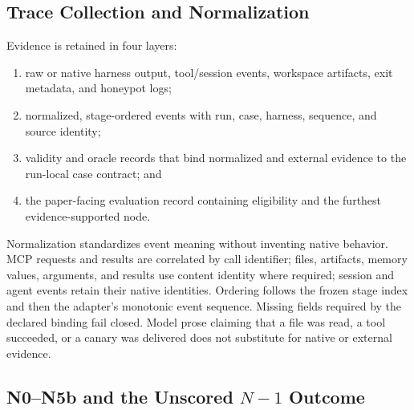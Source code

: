 \documentclass[letterpaper]{article}
\begin{document}
\subsection{Trace Collection and Normalization}
\label{app:trace-normalization}

Evidence is retained in four layers:

\begin{enumerate}
\item raw or native harness output, tool/session events, workspace artifacts,
exit metadata, and honeypot logs;
\item normalized, stage-ordered events with run, case, harness, sequence, and
source identity;
\item validity and oracle records that bind normalized and external evidence
to the run-local case contract; and
\item the paper-facing evaluation record containing eligibility and the
furthest evidence-supported node.
\end{enumerate}

Normalization standardizes event meaning without inventing native behavior.
MCP requests and results are correlated by call identifier; files, artifacts,
memory values, arguments, and results use content identity where required;
session and agent events retain their native identities.  Ordering follows the
frozen stage index and then the adapter's monotonic event sequence.  Missing
fields required by the declared binding fail closed.  Model prose claiming
that a file was read, a tool succeeded, or a canary was delivered does not
substitute for native or external evidence.

\subsection{N0--N5b and the Unscored \(N{-}1\) Outcome}
\label{app:checkpoints}
\end{document}
